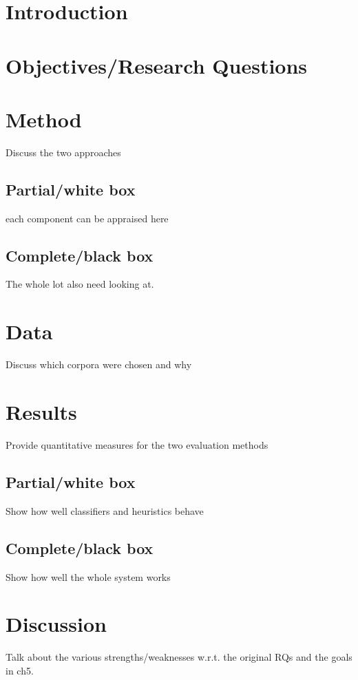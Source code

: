 \section*{Introduction}
\label{sec:evaluation:introduction}






\section{Objectives/Research Questions}
\label{sec:evaluation:rqs}




\section{Method}
\label{sec:evaluation:}
Discuss the two approaches
\subsection{Partial/white box}
each component can be appraised here
\subsection{Complete/black box}
The whole lot also need looking at.


\section{Data}
\label{sec:evaluation:method}
Discuss which corpora were chosen and why

\section{Results}
\label{sec:evaluation:}
Provide quantitative measures for the two evaluation methods
\subsection{Partial/white box}
Show how well classifiers and heuristics behave
\subsection{Complete/black box}
Show how well the whole system works


\section{Discussion}
\label{sec:evaluation:discussion}
Talk about the various strengths/weaknesses w.r.t. the original RQs and the goals in ch5.
